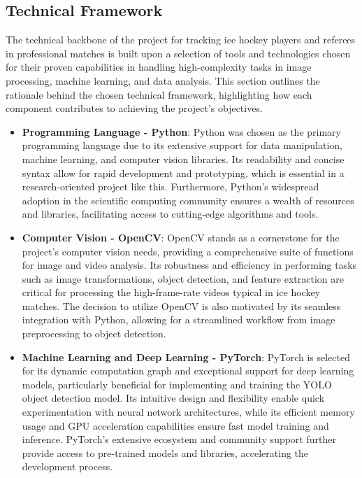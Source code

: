 \documentclass[12pt, letterpaper]{article}
\begin{document}
{
\setlength{\parskip}{0.3cm}
\subsection{Technical Framework}
\begin{spacing}{1.2}

The technical backbone of the project for tracking ice hockey players and referees in professional matches is built upon a selection of tools and technologies chosen for their proven capabilities in handling high-complexity tasks in image processing, machine learning, and data analysis. This section outlines the rationale behind the chosen technical framework, highlighting how each component contributes to achieving the project's objectives.

\begin{itemize}
    \item \textbf{Programming Language - Python}: Python was chosen as the primary programming language due to its extensive support for data manipulation, machine learning, and computer vision libraries. Its readability and concise syntax allow for rapid development and prototyping, which is essential in a research-oriented project like this. Furthermore, Python's widespread adoption in the scientific computing community ensures a wealth of resources and libraries, facilitating access to cutting-edge algorithms and tools.
    
    \item \textbf{Computer Vision - OpenCV}: OpenCV stands as a cornerstone for the project's computer vision needs, providing a comprehensive suite of functions for image and video analysis. Its robustness and efficiency in performing tasks such as image transformations, object detection, and feature extraction are critical for processing the high-frame-rate videos typical in ice hockey matches. The decision to utilize OpenCV is also motivated by its seamless integration with Python, allowing for a streamlined workflow from image preprocessing to object detection.
    
    \item \textbf{Machine Learning and Deep Learning - PyTorch}: PyTorch is selected for its dynamic computation graph and exceptional support for deep learning models, particularly beneficial for implementing and training the YOLO object detection model. Its intuitive design and flexibility enable quick experimentation with neural network architectures, while its efficient memory usage and GPU acceleration capabilities ensure fast model training and inference. PyTorch's extensive ecosystem and community support further provide access to pre-trained models and libraries, accelerating the development process.
    

\end{itemize}
\end{spacing}}
\end{document}
